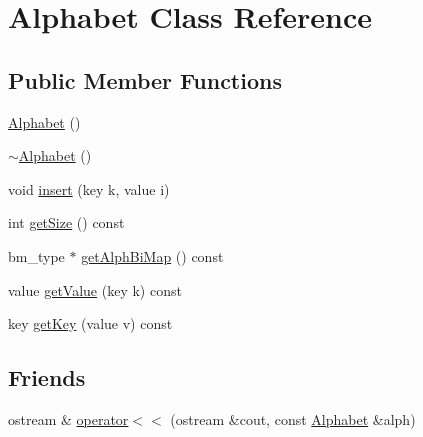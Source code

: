 \hypertarget{classAlphabet}{\section{Alphabet Class Reference}
\label{classAlphabet}
}
\subsection*{Public Member Functions}
\begin{DoxyCompactItemize}
\item 
\hyperlink{classAlphabet_aac9f2f615174ca6c8f89331239cb765e}{Alphabet} ()
\item 
\hyperlink{classAlphabet_a8a1da1bd7fdf2fd06a9768f9597a0b44}{$\sim$\-Alphabet} ()
\item 
void \hyperlink{classAlphabet_aedbea218764ce0b3a7a6c6c78c8bb512}{insert} (key k, value i)
\item 
int \hyperlink{classAlphabet_a549d8ebebef18a820f44c78d714fd57a}{get\-Size} () const 
\item 
bm\-\_\-type $\ast$ \hyperlink{classAlphabet_afd7f8853344abf9ffac03f5cd9926ab9}{get\-Alph\-Bi\-Map} () const 
\item 
value \hyperlink{classAlphabet_aaf6ac568ec863073cb5a053553b7a683}{get\-Value} (key k) const 
\item 
key \hyperlink{classAlphabet_ae9b301e2b793e74fad230f5ab66134da}{get\-Key} (value v) const 
\end{DoxyCompactItemize}
\subsection*{Friends}
\begin{DoxyCompactItemize}
\item 
ostream \& \hyperlink{classAlphabet_a4c763414b43f53cffd0537ba93827db8}{operator$<$$<$} (ostream \&cout, const \hyperlink{classAlphabet}{Alphabet} \&alph)
\end{DoxyCompactItemize}


